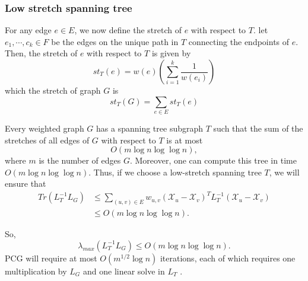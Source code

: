 \subsubsection{Low stretch spanning tree}
For any edge $e \in E$, we now define the stretch of $e$ with respect to $T$. let $e_1, \cdots, c_k \in F$ be the edges on the unique path in $T$ connecting the endpoints of $e$. Then, the stretch of $e$ with respect to $T$ is given by 
\[
    st_{T}(e)=w(e)(\sum_{i=1}^{k}\frac{1}{w(e_{i})})
\]
which the stretch of graph $G$ is
\[
    st_{T}(G) = \sum_{e \in E}st_{T}(e)
\]
\begin{theorem}
Every weighted graph $G$ has a spanning tree subgraph $T$ such that the sum of the stretches of all edges of $G$ with respect to $T$ is at most
\[
    O(m \log n \log\log n),
\]
where $m$ is the number of edges $G$. Moreover, one can compute this tree in time $O(m \log n \log\log n)$.
Thus, if we choose a low-stretch spanning tree $T$, we will ensure that
\begin{equation*}
    \begin{aligned}
        Tr(L_T^{-1}L_G) &\leq \sum_{(u,v)\in E}w_{u,v}(\mathcal{X}_{u} - \mathcal{X}_{v})^{T}L_{T}^{-1}(\mathcal{X}_{u} - \mathcal{X}_{v}) \\
        &\leq O(m \log n \log\log n).
    \end{aligned}
\end{equation*}
    
\end{theorem}
So, 
\[
    \lambda_{max}(L_T^{-1}L_G) \leq O(m \log n \log\log n).
\]
PCG will require at most $O(m^{1/2} \log n)$ iterations, each of which requires one multiplication by $L_G$ and one linear solve in $L_T$ .